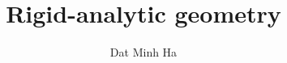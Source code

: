 

\setcounter{section}{-1}





	\title{Rigid-analytic geometry}
	
	\author{Dat Minh Ha}
	\maketitle
	
	\begin{abstract}
	    
	\end{abstract}
	
	{
      \hypersetup{} 
      \tableofcontents %
    }
    
    
    
    
    
    \begin{appendices}
        
    \end{appendices}
	
	\printbibliography

